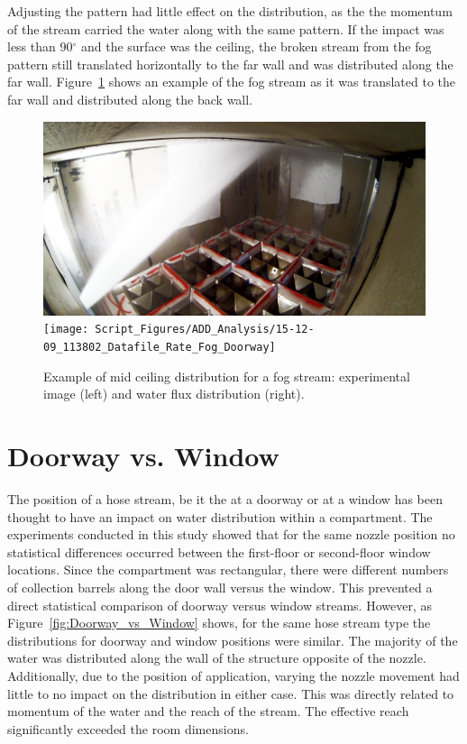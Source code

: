 \documentclass[12pt,oneside]{book}
\begin{document}
Adjusting the pattern had little effect on the distribution, as the the momentum of the stream carried the water along with the same pattern. If the impact was less than 90$^{\circ}$ and the surface was the ceiling, the broken stream from the fog pattern still translated horizontally to the far wall and was distributed along the far wall. Figure~\ref{fig:Doorway_Fog_MidCeiling} shows an example of the fog stream as it was translated to the far wall and distributed along the back wall.

\begin{figure}[!ht]
\centering
\includegraphics[height=0.25\textwidth]{Figures/Water_Distribution/Nozzle_Directions/Interior_MidCeiling_Fog}
\texttt{[image: Script\_Figures/ADD\_Analysis/15-12-09\_113802\_Datafile\_Rate\_Fog\_Doorway]}
\caption[Example of Mid Ceiling Distribution]{Example of mid ceiling distribution for a fog stream: experimental image (left) and water flux distribution (right).}
\label{fig:Doorway_Fog_MidCeiling}
\end{figure}

\section{Doorway vs. Window}
The position of a hose stream, be it the at a doorway or at a window has been thought to have an impact on water distribution within a compartment. The experiments conducted in this study showed that for the same nozzle position no statistical differences occurred between the first-floor or second-floor window locations. Since the compartment was rectangular, there were different numbers of collection barrels along the door wall versus the window. This prevented a direct statistical comparison of doorway versus window streams. However, as Figure~\ref{fig:Doorway_vs_Window} shows, for the same hose stream type the distributions for doorway and window positions were similar. The majority of the water was distributed along the wall of the structure opposite of the nozzle. Additionally, due to the position of application, varying the nozzle movement had little to no impact on the distribution in either case. This was directly related to momentum of the water and the reach of the stream. The effective reach significantly exceeded the room dimensions.
\end{document}
